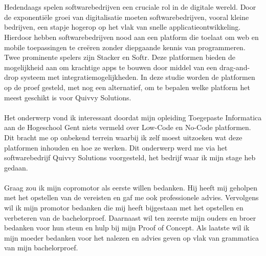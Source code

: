 
\chapter*{}%
\label{ch:voorwoord}

Hedendaags spelen softwarebedrijven een cruciale rol in de digitale wereld. 
Door de exponentiële groei van digitalisatie moeten softwarebedrijven, vooral kleine bedrijven, 
een stapje hogerop op het vlak van snelle applicatieontwikkeling. Hierdoor hebben softwarebedrijven nood aan 
een platform die toelaat om web en mobile toepassingen te creëren zonder diepgaande kennis van programmeren. 
Twee prominente spelers zijn Stacker en Softr. Deze platformen bieden de mogelijkheid aan om krachtige apps te bouwen 
door middel van een drag-and-drop systeem met integratiemogelijkheden. In deze studie worden de platformen op de proef gesteld, 
met nog een alternatief, om te bepalen welke platform het meest geschikt is voor Quivvy Solutions.
\\
\\
Het onderwerp vond ik interessant doordat mijn opleiding Toegepaste Informatica aan de Hogeschool Gent niets vermeld over Low-Code en No-Code platformen.
Dit bracht me op onbekend terrein waarbij ik zelf moest uitzoeken wat deze platformen inhouden en hoe ze werken. Dit onderwerp werd me via 
het softwarebedrijf Quivvy Solutions voorgesteld, het bedrijf waar ik mijn stage heb gedaan.
\\
\\
Graag zou ik mijn copromotor als eerste willen bedanken. Hij heeft mij geholpen met het opstellen van de vereisten en gaf me ook
professionele advies. Vervolgens wil ik mijn promotor bedanken die mij heeft bijgestaan met het opstellen en verbeteren van de bachelorproef. Daarnaast 
wil ten zeerste mijn ouders en broer bedanken voor hun steun en hulp bij mijn Proof of Concept. 
Als laatste wil ik mijn moeder bedanken voor het nalezen en advies geven op vlak van grammatica van mijn bachelorproef.

